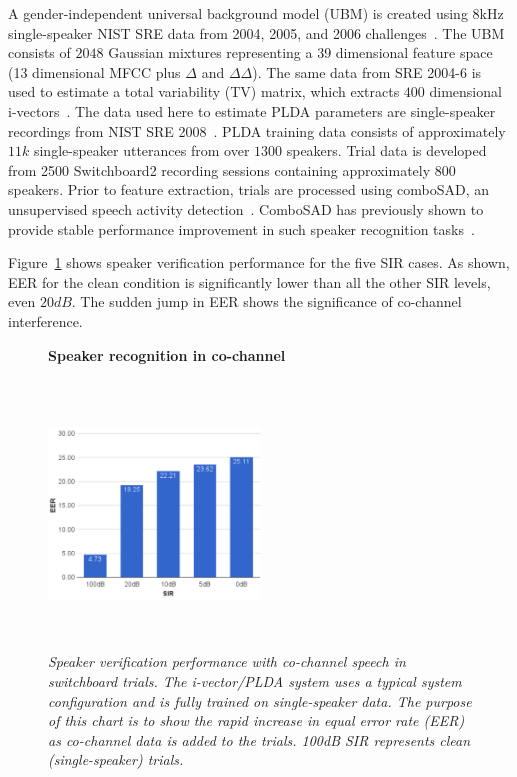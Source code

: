 A gender-independent universal background model (UBM) is created using 8kHz single-speaker NIST SRE data from 2004, 2005, and 2006 challenges~\cite{NIST04,NIST05,NIST06}. 
The UBM consists of $2048$ Gaussian mixtures representing a 39 dimensional feature space (13 dimensional MFCC plus $\Delta$ and $\Delta\Delta$). 
The same data from SRE 2004-6 is used to estimate a total variability (TV) matrix, which extracts $400$ dimensional i-vectors~\cite{Dehak_ivector}. 
The data used here to estimate PLDA parameters are single-speaker recordings from NIST SRE 2008~\cite{NIST08}. 
PLDA training data consists of approximately $11k$ single-speaker utterances from over $1300$ speakers. 
Trial data is developed from 2500 Switchboard2 recording sessions containing approximately $800$ speakers. 
Prior to feature extraction, trials are processed using comboSAD, an unsupervised speech activity detection~\cite{sadjadi2013unsupervised}. ComboSAD has previously shown to provide stable performance improvement in such speaker recognition tasks~\cite{hasan2013crss}. 

Figure~\ref{fig:cch_in_sid} shows speaker verification performance for the five SIR cases. 
As shown, EER for the clean condition is significantly lower than all the other SIR levels, even $20dB$. 
The sudden jump in EER shows the significance of co-channel interference. 

\begin{figure}[h!]
	\centering
	\textbf{Speaker recognition in co-channel}\par\medskip
	\includegraphics[height = 2.8in, width=0.5\textwidth]{figures/eer_vs_sir_swb2_baseline}
	\vspace{-2mm}
	\caption{\it \small Speaker verification performance with co-channel speech in switchboard trials. The i-vector/PLDA system uses a typical system configuration and is fully trained on single-speaker data. The purpose of this chart is to show the rapid increase in equal error rate (EER) as co-channel data is added to the trials. 100dB SIR represents clean (single-speaker) trials.}
	\label{fig:cch_in_sid}
	\vspace{-1mm}
\end{figure}

